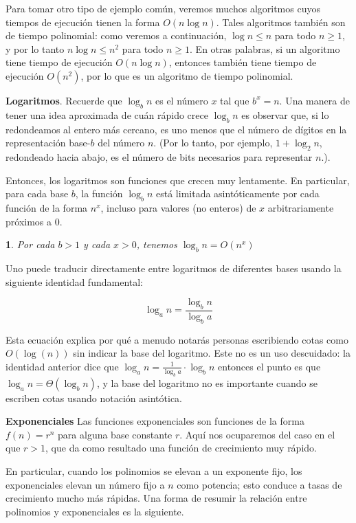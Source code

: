 \documentclass[a4paper, 12pt]{book}
\theoremstyle{dotless}
\newtheorem{theorem}{}%
\begin{document}
Para tomar otro tipo de ejemplo común, veremos muchos algoritmos cuyos tiempos de ejecución tienen la forma $O(n\log n)$. Tales algoritmos también son de tiempo polinomial: como veremos a continuación, $\log n ≤ n$ para todo $n ≥ 1$, y por lo tanto $n \log n ≤ n^2$ para todo $n ≥ 1$. En otras palabras, si un algoritmo tiene tiempo de ejecución $O(n\log n)$, entonces también tiene tiempo de ejecución $O(n^2)$, por lo que es un algoritmo de tiempo polinomial.

\textbf{Logaritmos}. Recuerde que $\log_b n$ es el número $x$ tal que $b^x = n$. Una manera de tener una idea aproximada de cuán rápido crece $\log_b n$ es observar que, si lo redondeamos al entero más cercano, es uno menos que el número de dígitos en la representación base-$b$ del número $n$. (Por lo tanto, por ejemplo, $1 + \log_2 n$, redondeado hacia abajo, es el número de bits necesarios para representar $n$.).

Entonces, los logaritmos son funciones que crecen muy lentamente. En particular, para cada base $b$, la función $\log_b n$ está limitada asintóticamente por cada función de la forma $n^x$, incluso para valores (no enteros) de $x$ arbitrariamente próximos a $0$.

\begin{theorem}
Por cada $b>1$ y cada $x>0$, tenemos $\log_bn = O(n^x)$
\end{theorem}

Uno puede traducir directamente entre logaritmos de diferentes bases usando la siguiente identidad fundamental:

$$\log_an = \frac{\log_bn}{\log_ba}$$

Esta ecuación explica por qué a menudo notarás personas escribiendo cotas como $O(\log(n))$ sin indicar la base del logaritmo. Este no es un uso descuidado: la identidad anterior dice que $\log_an = \frac{1}{\log_ba}\cdot\log_bn$ entonces el punto es que $\log_an = \Theta(\log_bn)$, y la base del logaritmo no es importante cuando se escriben cotas usando notación asintótica.


\textbf{Exponenciales} Las funciones exponenciales son funciones de la forma $f(n) = r^n$ para alguna base constante $r$. Aquí nos ocuparemos del caso en el que $r>1$, que da como resultado una función de crecimiento muy rápido.

En particular, cuando los polinomios se elevan a un exponente fijo, los exponenciales elevan un número fijo a $n$ como potencia; esto conduce a tasas de crecimiento mucho más rápidas. Una forma de resumir la relación entre polinomios y exponenciales es la siguiente.
\end{document}
